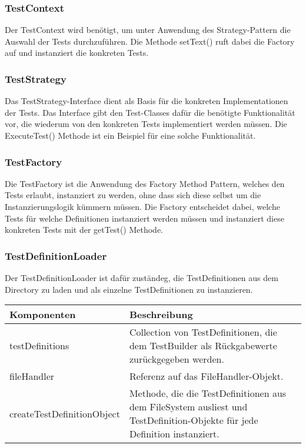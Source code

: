 \documentclass[
	ngerman,
	toc=listof, %
	toc=bibliography, %
	footnotes=multiple, %
	parskip=half, %
	numbers=noendperiod %
]{scrartcl}
\begin{document}
	\subsubsection{TestContext}
	Der TestContext wird benötigt, um unter Anwendung des Strategy-Pattern die Auswahl der Tests durchzuführen.
	Die Methode setText() ruft dabei die Factory auf und instanziert die konkreten Tests.

	\subsubsection{TestStrategy}
	Das TestStrategy-Interface dient als Basis für die konkreten Implementationen der Tests. 
	Das Interface gibt den Test-Classes dafür die benötigte Funktionalität vor, die wiederum von den konkreten Tests implementiert werden müssen.
	Die ExecuteTest() Methode ist ein Beispiel für eine solche Funktionalität.

	\subsubsection{TestFactory}
	Die TestFactory ist die Anwendung des Factory Method Pattern, welches den Tests erlaubt, instanziert zu werden, ohne dass sich diese selbst um die Instanzierungslogik kümmern müssen.
	Die Factory entscheidet dabei, welche Tests für welche Definitionen instanziert werden müssen und instanziert diese konkreten Tests mit der getTest() Methode.

	\subsubsection{TestDefinitionLoader}
	Der TestDefinitionLoader ist dafür zuständeg, die TestDefinitionen aus dem Directory zu laden und als einzelne TestDefinitionen zu instanzieren.
	
	\begin{tabularx}{\textwidth}{lX}
		\toprule
			Komponenten & Beschreibung \\
		\midrule
			testDefinitions & Collection von TestDefinitionen, die dem TestBuilder als Rückgabewerte zurückgegeben werden. \\
			fileHandler & Referenz auf das FileHandler-Objekt. \\
		\midrule
			createTestDefinitionObject & Methode, die die TestDefinitionen aus dem FileSystem ausliest und TestDefinition-Objekte für jede Definition instanziert. \\
		\bottomrule
	\end{tabularx}
\end{document}
